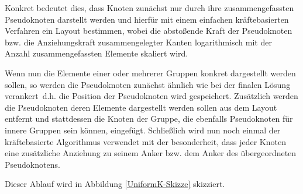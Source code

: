 Konkret bedeutet dies, dass Knoten zunächst nur durch ihre zusammengefassten Pseudoknoten darstellt werden und hierfür mit einem einfachen kräftebasierten Verfahren ein Layout bestimmen, wobei die abstoßende Kraft der Pseudoknoten bzw. die Anziehungskraft zusammengelegter Kanten logarithmisch mit der Anzahl zusammengefassten Elemente skaliert wird.

Wenn nun die Elemente einer oder mehrerer Gruppen konkret dargestellt werden sollen, so werden die Pseudoknoten zunächst ähnlich wie bei der finalen Lösung \glqq verankert\grqq\, d.h. die Position der Pseudoknoten wird gespeichert. Zusätzlich werden die Pseudoknoten deren Elemente dargestellt werden sollen aus dem Layout entfernt und stattdessen die Knoten der Gruppe, die ebenfalls Pseudoknoten für innere Gruppen sein können, eingefügt. Schließlich wird nun noch einmal der kräftebasierte Algorithmus verwendet mit der besonderheit, dass jeder Knoten eine zusätzliche Anziehung zu seinem Anker bzw. dem Anker des übergeordneten Pseudoknotens.

Dieser Ablauf wird in Abbildung \ref{UniformK-Skizze} skizziert.


